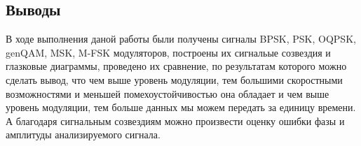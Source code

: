 \documentclass[10pt,a4paper]{article}
\begin{document}
\FloatBarrier
\subsection{Выводы}
В ходе выполнения даной работы были получены сигналы BPSK, PSK, OQPSK, genQAM, MSK, M-FSK модуляторов, построены их сигнальые созвездия и глазковые диаграммы, проведено их сравнение, по результатам которого можно сделать вывод, что чем выше уровень модуляции, тем большими скоростными возможностями и меньшей помехоустойчивостью она обладает и чем выше уровень модуляции, тем больше данных мы можем передать за единицу времени. А благодаря сигнальным созвездиям можно произвести оценку ошибки фазы и амплитуды анализируемого сигнала.
\end{document}
